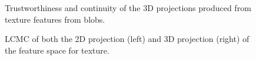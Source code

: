 \begin{figure}[H]
	\centering
	\caption{Trustworthiness and continuity of the 3D projections produced from texture features from blobs.}\label{fig:TC_3d_texture}
\end{figure}

\begin{figure}[H]
	\centering
	\caption{LCMC of both the 2D projection (left) and 3D projection (right) of the feature space for texture.}\label{fig:LCMC_texture}
\end{figure}
\clearpage

